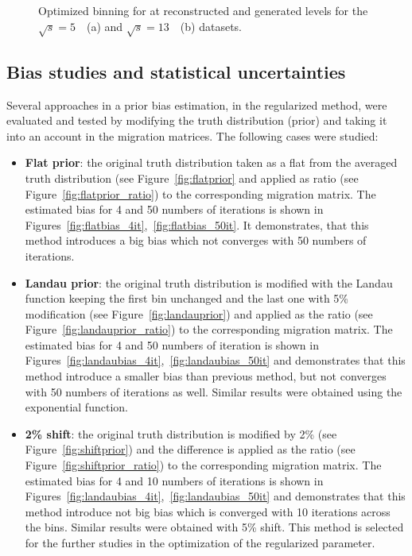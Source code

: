 \begin{figure}[h]
\centering
{}
\caption{Optimized binning for \ptw at reconstructed and generated levels for the $\sqrt{s} = 5$~\TeV\ (a) and $\sqrt{s} = 13$~\TeV\ (b) datasets. }\end{figure}

\subsection{Bias studies and statistical uncertainties}
Several approaches in a prior bias estimation, in the regularized method, were evaluated and tested by modifying the truth distribution (prior) and taking it into an account in the migration matrices. The following cases were studied:

\begin{itemize}
\item \textbf{Flat prior}: the original truth distribution taken as a flat from the averaged truth distribution (see Figure~\ref{fig:flatprior} and applied as ratio (see Figure~\ref{fig:flatprior_ratio}) to the corresponding migration matrix. The estimated bias for 4 and 50 numbers of iterations is shown in Figures~\ref{fig:flatbias_4it},~\ref{fig:flatbias_50it}. It demonstrates, that this method introduces a big bias which not converges with 50 numbers of iterations.
\end{itemize}

\begin{itemize}
\item \textbf{Landau prior}: the original truth distribution is modified with the Landau function keeping the first bin unchanged and the last one with 5\% modification (see Figure~\ref{fig:landauprior}) and applied as the ratio (see Figure~\ref{fig:landauprior_ratio}) to the corresponding migration matrix. The estimated bias for 4 and 50 numbers of iteration is shown in Figures~\ref{fig:landaubias_4it},~\ref{fig:landaubias_50it} and demonstrates that this method introduce a smaller bias than previous method, but not converges with 50 numbers of iterations as well. Similar results were obtained using the exponential function.
\end{itemize}

\begin{itemize}
\item \textbf{2\% shift}: the original truth distribution is modified by 2\%  (see Figure~\ref{fig:shiftprior}) and the difference is applied as the ratio (see Figure~\ref{fig:shiftprior_ratio}) to the corresponding migration matrix. The estimated bias for 4 and 10 numbers of iterations is shown in Figures~\ref{fig:landaubias_4it},~\ref{fig:landaubias_50it} and demonstrates that this method introduce not big bias which is converged with 10 iterations across the bins. Similar results were obtained with 5\% shift. This method is selected for the further studies in the optimization of the regularized parameter.
\end{itemize}

